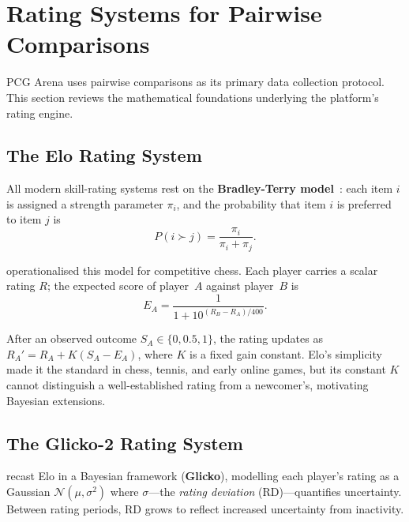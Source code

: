 \documentclass[shortabstract, mgr, english]{iithesis}
\begin{document}
\section{Rating Systems for Pairwise Comparisons}
\label{sec:bg-rating}

PCG Arena uses pairwise comparisons as its primary data collection protocol.
This section reviews the mathematical foundations underlying the platform's
rating engine.

\subsection{The Elo Rating System}
\label{subsec:bg-elo}

All modern skill-rating systems rest on the \textbf{Bradley-Terry
model}~\citep{bradley1952rank}: each item $i$ is assigned a strength parameter
$\pi_i$, and the probability that item $i$ is preferred to item $j$ is
%
\begin{equation}
\label{eq:bt}
P(i \succ j) = \frac{\pi_i}{\pi_i + \pi_j}.
\end{equation}

\citet{elo1978rating} operationalised this model for competitive chess. Each
player carries a scalar rating $R$; the expected score of player~$A$ against
player~$B$ is
%
\begin{equation}
\label{eq:elo}
E_A = \frac{1}{1 + 10^{(R_B - R_A)/400}}.
\end{equation}

After an observed outcome $S_A \in \{0, 0.5, 1\}$, the rating updates as
$R_A' = R_A + K(S_A - E_A)$, where $K$ is a fixed gain constant. Elo's
simplicity made it the standard in chess, tennis, and early online games, but its
constant $K$ cannot distinguish a well-established rating from a newcomer's,
motivating Bayesian extensions.

\subsection{The Glicko-2 Rating System}
\label{subsec:bg-glicko2}

\citet{glickman1999parameter} recast Elo in a Bayesian framework
(\textbf{Glicko}), modelling each player's rating as a Gaussian
$\mathcal{N}(\mu, \sigma^2)$ where $\sigma$---the \emph{rating deviation}
(RD)---quantifies uncertainty. Between rating periods, RD grows to reflect
increased uncertainty from inactivity.
\end{document}
